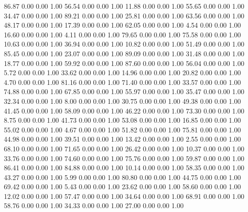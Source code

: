    86.87   0.00   0.00   1.00
   56.54   0.00   0.00   1.00
   11.88   0.00   0.00   1.00
   55.65   0.00   0.00   1.00
   34.47   0.00   0.00   1.00
   89.21   0.00   0.00   1.00
   25.81   0.00   0.00   1.00
   63.56   0.00   0.00   1.00
   48.17   0.00   0.00   1.00
   17.39   0.00   0.00   1.00
   62.05   0.00   0.00   1.00
    4.54   0.00   0.00   1.00
   16.60   0.00   0.00   1.00
    4.11   0.00   0.00   1.00
   79.65   0.00   0.00   1.00
   75.58   0.00   0.00   1.00
   10.63   0.00   0.00   1.00
   36.94   0.00   0.00   1.00
   10.82   0.00   0.00   1.00
   51.49   0.00   0.00   1.00
   85.45   0.00   0.00   1.00
   23.07   0.00   0.00   1.00
   89.09   0.00   0.00   1.00
   31.48   0.00   0.00   1.00
   18.77   0.00   0.00   1.00
   59.92   0.00   0.00   1.00
   87.60   0.00   0.00   1.00
   56.04   0.00   0.00   1.00
    5.72   0.00   0.00   1.00
   33.62   0.00   0.00   1.00
   14.96   0.00   0.00   1.00
   20.82   0.00   0.00   1.00
    4.70   0.00   0.00   1.00
   81.16   0.00   0.00   1.00
   71.40   0.00   0.00   1.00
   33.57   0.00   0.00   1.00
   74.88   0.00   0.00   1.00
   67.85   0.00   0.00   1.00
   55.97   0.00   0.00   1.00
   35.47   0.00   0.00   1.00
   32.34   0.00   0.00   1.00
    8.00   0.00   0.00   1.00
   30.75   0.00   0.00   1.00
   49.38   0.00   0.00   1.00
   41.45   0.00   0.00   1.00
   58.09   0.00   0.00   1.00
   46.22   0.00   0.00   1.00
   73.30   0.00   0.00   1.00
    8.75   0.00   0.00   1.00
   41.73   0.00   0.00   1.00
   53.08   0.00   0.00   1.00
   16.85   0.00   0.00   1.00
   55.02   0.00   0.00   1.00
    4.67   0.00   0.00   1.00
   51.82   0.00   0.00   1.00
   75.81   0.00   0.00   1.00
   44.98   0.00   0.00   1.00
   39.51   0.00   0.00   1.00
   13.42   0.00   0.00   1.00
    2.55   0.00   0.00   1.00
   68.10   0.00   0.00   1.00
   71.65   0.00   0.00   1.00
   26.42   0.00   0.00   1.00
   10.37   0.00   0.00   1.00
   33.76   0.00   0.00   1.00
   74.60   0.00   0.00   1.00
   75.76   0.00   0.00   1.00
   59.87   0.00   0.00   1.00
   86.41   0.00   0.00   1.00
   84.88   0.00   0.00   1.00
   10.14   0.00   0.00   1.00
   58.35   0.00   0.00   1.00
   43.27   0.00   0.00   1.00
    5.99   0.00   0.00   1.00
   80.80   0.00   0.00   1.00
   44.75   0.00   0.00   1.00
   69.42   0.00   0.00   1.00
    5.43   0.00   0.00   1.00
   23.62   0.00   0.00   1.00
   58.60   0.00   0.00   1.00
   12.02   0.00   0.00   1.00
   57.47   0.00   0.00   1.00
   34.64   0.00   0.00   1.00
   68.91   0.00   0.00   1.00
   58.76   0.00   0.00   1.00
   34.33   0.00   0.00   1.00
   27.00   0.00   0.00   1.00
